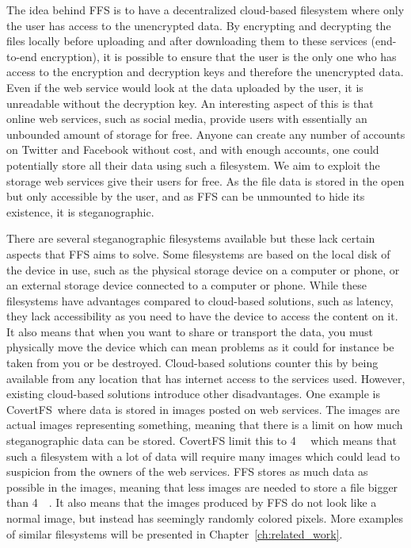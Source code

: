 The idea behind \gls{FFS} is to have a decentralized cloud-based filesystem where only the user has access to the unencrypted data. By encrypting and decrypting the files locally before uploading and after downloading them to these services (end-to-end encryption), it is possible to ensure that the user is the only one who has access to the encryption and decryption keys and therefore the unencrypted data. Even if the web service would look at the data uploaded by the user, it is unreadable without the decryption key. An interesting aspect of this is that online web services, such as social media, provide users with essentially an unbounded amount of storage for free. Anyone can create any number of accounts on Twitter and Facebook without cost, and with enough accounts, one could potentially store all their data using such a filesystem. We aim to exploit the storage web services give their users for free. As the file data is stored in the open but only accessible by the user, and as \gls{FFS} can be unmounted to hide its existence, it is steganographic. 

There are several steganographic filesystems available but these lack certain aspects that \gls{FFS} aims to solve. Some filesystems are based on the local disk of the device in use, such as the physical storage device on a computer or phone, or an external storage device connected to a computer or phone. While these filesystems have advantages compared to cloud-based solutions, such as latency, they lack accessibility as you need to have the device to access the content on it. It also means that when you want to share or transport the data, you must physically move the device which can mean problems as it could for instance be taken from you or be destroyed. Cloud-based solutions counter this by being available from any location that has internet access to the services used. However, existing cloud-based solutions introduce other disadvantages. One example is CovertFS\,\cite{baliga2007web} where data is stored in images posted on web services. The images are actual images representing something, meaning that there is a limit on how much steganographic data can be stored. CovertFS limit this to \SI{4}{\kilo\byte} which means that such a filesystem with a lot of data will require many images which could lead to suspicion from the owners of the web services. \gls{FFS} stores as much data as possible in the images, meaning that less images are needed to store a file bigger than \SI{4}{\kilo\byte}. It also means that the images produced by \gls{FFS} do not look like a normal image, but instead has seemingly randomly colored pixels. More examples of similar filesystems will be presented in Chapter~\ref{ch:related_work}. 